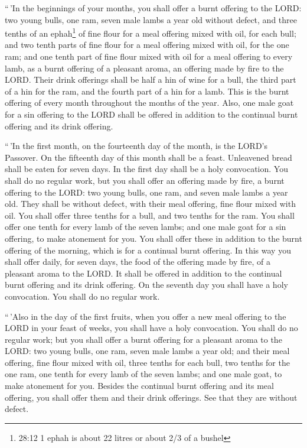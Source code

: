  ``\,'In the beginnings of your months, you shall offer a
burnt offering to the LORD: two young bulls, one ram, seven male lambs a
year old without defect,  and three tenths of an
ephah\footnote{28:12 1 ephah is about 22 litres or about 2/3 of a bushel}
of fine flour for a meal offering mixed with oil, for each bull; and two
tenth parts of fine flour for a meal offering mixed with oil, for the
one ram;  and one tenth part of fine flour mixed with oil
for a meal offering to every lamb, as a burnt offering of a pleasant
aroma, an offering made by fire to the LORD.  Their drink
offerings shall be half a hin of wine for a bull, the third part of a
hin for the ram, and the fourth part of a hin for a lamb. This is the
burnt offering of every month throughout the months of the year.
 Also, one male goat for a sin offering to the LORD shall
be offered in addition to the continual burnt offering and its drink
offering.

 ``\,'In the first month, on the fourteenth day of the
month, is the LORD's Passover.  On the fifteenth day of
this month shall be a feast. Unleavened bread shall be eaten for seven
days.  In the first day shall be a holy convocation. You
shall do no regular work,  but you shall offer an offering
made by fire, a burnt offering to the LORD: two young bulls, one ram,
and seven male lambs a year old. They shall be without defect,
 with their meal offering, fine flour mixed with oil. You
shall offer three tenths for a bull, and two tenths for the ram.
 You shall offer one tenth for every lamb of the seven
lambs;  and one male goat for a sin offering, to make
atonement for you.  You shall offer these in addition to
the burnt offering of the morning, which is for a continual burnt
offering.  In this way you shall offer daily, for seven
days, the food of the offering made by fire, of a pleasant aroma to the
LORD. It shall be offered in addition to the continual burnt offering
and its drink offering.  On the seventh day you shall have
a holy convocation. You shall do no regular work.

 ``\,'Also in the day of the first fruits, when you offer a
new meal offering to the LORD in your feast of weeks, you shall have a
holy convocation. You shall do no regular work;  but you
shall offer a burnt offering for a pleasant aroma to the LORD: two young
bulls, one ram, seven male lambs a year old;  and their
meal offering, fine flour mixed with oil, three tenths for each bull,
two tenths for the one ram,  one tenth for every lamb of
the seven lambs;  and one male goat, to make atonement for
you.  Besides the continual burnt offering and its meal
offering, you shall offer them and their drink offerings. See that they
are without defect.

